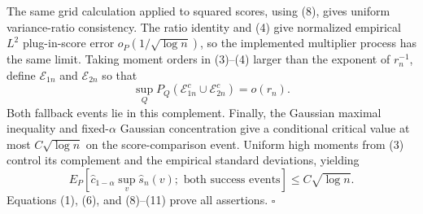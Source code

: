 The same grid calculation applied to squared scores, using (8), gives uniform variance-ratio consistency.  The ratio identity and (4) give normalized empirical \(L^2\) plug-in-score error \(o_P(1/\sqrt{\log n})\), so the implemented multiplier process has the same limit.  Taking moment orders in (3)--(4) larger than the exponent of \(r_n^{-1}\), define \(\mathcal E_{1n}\) and \(\mathcal E_{2n}\) so that
\[
 \sup_QP_Q(\mathcal E_{1n}^c\cup\mathcal E_{2n}^c)=o(r_n). \tag{10}
\]
Both fallback events lie in this complement.  Finally, the Gaussian maximal inequality and fixed-\(\alpha\) Gaussian concentration give a conditional critical value at most \(C\sqrt{\log n}\) on the score-comparison event.  Uniform high moments from (3) control its complement and the empirical standard deviations, yielding
\[
 E_P[\widehat c_{1-\alpha}\sup_v\widehat s_n(v);\text{ both success events}]
 \le C\sqrt{\log n}. \tag{11}
\]
Equations (1), (6), and (8)--(11) prove all assertions. \(\square\)
